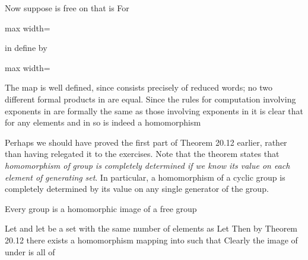\documentclass[11pt,oneside]{article}
\begin{document}
\BookNarrativetrue

\begin{BookBody}

Now suppose  is free on  that is For

\begin{center}\begin{adjustbox}{max width=\linewidth}\end{adjustbox}\end{center}

\noindent in  define  by

\begin{center}\begin{adjustbox}{max width=\linewidth}\end{adjustbox}\end{center}

\noindent The map is well defined, since  consists precisely of reduced words; no two different formal products in  are equal. Since the rules for computation involving exponents in  are formally the same as those involving exponents in  it is clear that  for any elements  and  in  so \BookInline{\psi } is indeed a homomorphism\BookEnd{\blacklozenge}

Perhaps we should have proved the first part of Theorem 20.12 earlier, rather than having relegated it to the exercises. Note that the theorem states that  \textit{homomorphism of}  \textit{group is completely determined if we know its value on each element of}  \textit{generating} \textit{set}. In particular, a homomorphism of a cyclic group is completely determined by its value on any single generator of the group.

 Every group  is a homomorphic image of a free group 

 Let  and let  be a set with the same number of elements as  Let  Then by Theorem 20.12 there exists a homomorphism \BookInline{\psi } mapping  into  such that  Clearly the image of  under \BookInline{\psi } is all of \BookEnd{\blacklozenge}


\end{BookBody}
\end{document}
